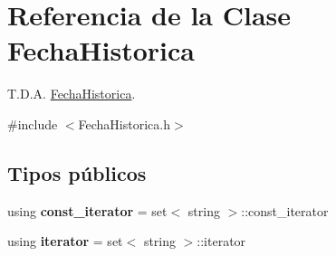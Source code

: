 \hypertarget{classFechaHistorica}{}\section{Referencia de la Clase Fecha\+Historica}
\label{classFechaHistorica}


T.\+D.\+A. \hyperlink{classFechaHistorica}{Fecha\+Historica}.  




{\ttfamily \#include $<$Fecha\+Historica.\+h$>$}

\subsection*{Tipos públicos}
\begin{DoxyCompactItemize}
\item 
\mbox{\label{classFechaHistorica_a53b481cd809e636969f2aed18762f1fa}} 
using {\bfseries const\+\_\+iterator} = set$<$ string $>$\+::const\+\_\+iterator
\item 
\mbox{\label{classFechaHistorica_a8b774507bf02704d663f10d64481ac7e}} 
using {\bfseries iterator} = set$<$ string $>$\+::iterator
\end{DoxyCompactItemize}
